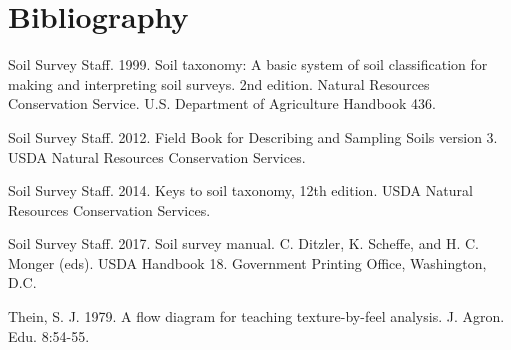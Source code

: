 \documentclass{article}
\begin{document}




\backmatter
\section*{Bibliography}

Soil Survey Staff. 1999. Soil taxonomy: A basic system of soil classification for making and interpreting soil surveys. 2nd edition. Natural Resources Conservation Service. U.S. Department of Agriculture Handbook 436.

Soil Survey Staff. 2012. Field Book for Describing and Sampling Soils version 3.  USDA Natural Resources Conservation Services.

Soil Survey Staff. 2014. Keys to soil taxonomy, 12th edition. USDA Natural Resources Conservation Services.

Soil Survey Staff. 2017. Soil survey manual. C. Ditzler, K. Scheffe, and H. C. Monger (eds). USDA Handbook 18. Government Printing Office, Washington, D.C.

Thein, S. J. 1979. A flow diagram for teaching texture-by-feel analysis. J. Agron. Edu. 8:54-55.
\end{document}
